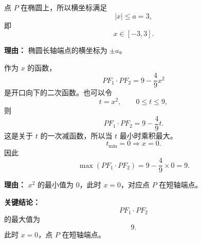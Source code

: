 \begin{examplebox}
\begin{description}[style=nextline, leftmargin=2.8em, labelsep=0.5em, itemsep=0.45em]
		\item[\textbf{第二步（确定 $x$ 范围）：}] 点 $P$ 在椭圆上，所以横坐标满足
		      \[
			      |x|\le a=3,
		      \]
		      即
		      \[
			      x\in[-3,3].
		      \]
		      \par\textbf{理由：} 椭圆长轴端点的横坐标为 $\pm a$。

		\item[\textbf{第三步（求最值）：}] 作为 $x$ 的函数，
		      \[
			      PF_1\cdot PF_2=9-\frac{4}{9}x^2
		      \]
		      是开口向下的二次函数。也可以令
		      \[
			      t=x^2,\qquad 0\le t\le 9,
		      \]
		      则
		      \[
			      PF_1\cdot PF_2=9-\frac{4}{9}t.
		      \]
		      这是关于 $t$ 的一次减函数，所以当 $t$ 最小时乘积最大。
		      \[
			      t_{\min}=0\Rightarrow x=0.
		      \]
		      因此
		      \[
			      \max(PF_1\cdot PF_2)=9-\frac{4}{9}\times 0=9.
		      \]
		      \par\textbf{理由：} $x^2$ 的最小值为 $0$，此时 $x=0$，对应点 $P$ 在短轴端点。
	\end{description}

	\textbf{\textcolor{CExample}{关键结论：}}
	\[
		PF_1\cdot PF_2
	\]
	的最大值为
	\[
		9.
	\]
	此时 $x=0$，点 $P$ 在短轴端点。
\end{examplebox}